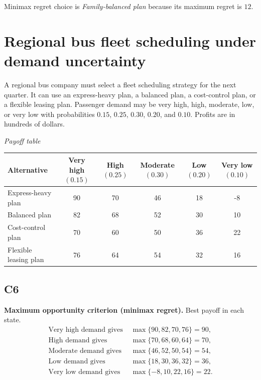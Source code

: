 \begin{ExamProblems}
		Minimax regret choice is \emph{Family-balanced plan} because its maximum regret is $12$.

		\item
		\section{Regional bus fleet scheduling under demand uncertainty}
		A regional bus company must select a fleet scheduling strategy for the next quarter. It can use an express-heavy plan, a balanced plan, a cost-control plan, or a flexible leasing plan. Passenger demand may be very high, high, moderate, low, or very low with probabilities $0.15$, $0.25$, $0.30$, $0.20$, and $0.10$. Profits are in hundreds of dollars.

		\begin{center}
			\textit{Payoff table}\\
			\begin{tabular}{l c c c c c}
				\toprule
				Alternative & Very high $(0.15)$ & High $(0.25)$ & Moderate $(0.30)$ & Low $(0.20)$ & Very low $(0.10)$ \\
				\midrule
				Express-heavy plan & 90 & 70 & 46 & 18 & -8 \\
				Balanced plan & 82 & 68 & 52 & 30 & 10 \\
				Cost-control plan & 70 & 60 & 50 & 36 & 22 \\
				Flexible leasing plan & 76 & 64 & 54 & 32 & 16 \\
				\bottomrule
			\end{tabular}
		\end{center}

		\subsection*{C6}
		\textbf{Maximum opportunity criterion (minimax regret).} Best payoff in each state.
		\[
		\begin{aligned}
		\text{Very high demand gives } &\max\{90,82,70,76\}=90,\\
		\text{High demand gives } &\max\{70,68,60,64\}=70,\\
		\text{Moderate demand gives } &\max\{46,52,50,54\}=54,\\
		\text{Low demand gives } &\max\{18,30,36,32\}=36,\\
		\text{Very low demand gives } &\max\{-8,10,22,16\}=22.
		\end{aligned}
		\]


\end{ExamProblems}
